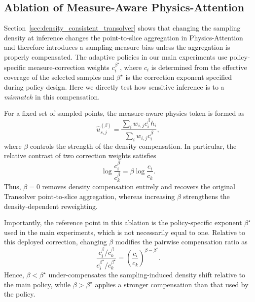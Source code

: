 \subsection{Ablation of Measure-Aware Physics-Attention}
\label{app:beta_ablation}

Section~\ref{sec:density_consistent_transolver} shows that changing the
sampling density at inference changes the point-to-slice aggregation in
Physics-Attention and therefore introduces a sampling-measure bias unless
the aggregation is properly compensated. The adaptive policies in our main
experiments use policy-specific measure-correction weights $c_i^{\beta^\star}$,
where $c_i$ is determined from the effective coverage of the selected
samples and $\beta^\star$ is the correction exponent specified during
policy design. Here we directly test how sensitive inference is to a
\emph{mismatch} in this compensation.

For a fixed set of sampled points, the measure-aware physics token is
formed as
\begin{equation}
    \widehat{u}_{s,j}^{(\beta)}
    =
    \frac{
        \sum_i w_{i,j} c_i^\beta h_i
    }{
        \sum_i w_{i,j} c_i^\beta
    },
    \label{eq:beta_token}
\end{equation}
where $\beta$ controls the strength of the density compensation.
In particular, the relative contrast of two correction weights satisfies
\begin{equation}
    \log
    \frac{c_i^\beta}{c_k^\beta}
    =
    \beta
    \log
    \frac{c_i}{c_k}.
    \label{eq:beta_weight_contrast}
\end{equation}
Thus, $\beta=0$ removes density compensation entirely and recovers the
original Transolver point-to-slice aggregation, whereas increasing
$\beta$ strengthens the density-dependent reweighting.

Importantly, the reference point in this ablation is the
policy-specific exponent $\beta^\star$ used in the main experiments,
which is not necessarily equal to one. Relative to this deployed
correction, changing $\beta$ modifies the pairwise compensation ratio as
\begin{equation}
    \frac{
        c_i^\beta/c_k^\beta
    }{
        c_i^{\beta^\star}/c_k^{\beta^\star}
    }
    =
    \left(
        \frac{c_i}{c_k}
    \right)^{\beta-\beta^\star}.
    \label{eq:beta_mismatch}
\end{equation}
Hence, $\beta<\beta^\star$ under-compensates the sampling-induced density
shift relative to the main policy, while $\beta>\beta^\star$ applies a
stronger compensation than that used by the policy.

